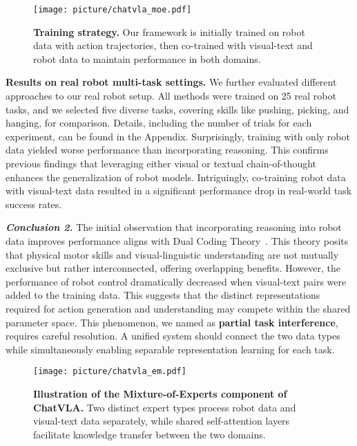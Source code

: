 \begin{figure}[t]
    \centering
    \texttt{[image: picture/chatvla\_moe.pdf]}
    \caption{\textbf{Training strategy.} Our framework is initially trained on robot data with action trajectories, then co-trained with visual-text and robot data to maintain performance in both domains.}
    \label{fig:stage}
\end{figure}
\textbf{Results on real robot multi-task settings.} We further evaluated different approaches to our real robot setup. All methods were trained on 25 real robot tasks, and we selected five diverse tasks, covering skills like pushing, picking, and hanging, for comparison.  Details, including the number of trials for each experiment, can be found in the Appendix.  Surprisingly, training with only robot data yielded worse performance than incorporating reasoning. This confirms previous findings that leveraging either visual or textual chain-of-thought enhances the generalization of robot models.  Intriguingly, co-training robot data with visual-text data resulted in a significant performance drop in real-world task success rates.

\textbf{\textit{Conclusion 2.}} The initial observation that incorporating reasoning into robot data improves performance aligns with Dual Coding Theory~\cite{paivio1991dual}.  This theory posits that physical motor skills and visual-linguistic understanding are not mutually exclusive but rather interconnected, offering overlapping benefits. However, the performance of robot control dramatically decreased when visual-text pairs were added to the training data. This suggests that the distinct representations required for action generation and understanding may compete within the shared parameter space. This phenomenon, we named as \textbf{partial task interference}, requires careful resolution. A unified system should connect the two data types while simultaneously enabling separable representation learning for each task.


\begin{figure}[t]
    \centering
    \texttt{[image: picture/chatvla\_em.pdf]}
    \caption{\textbf{Illustration of the Mixture-of-Experts component of ChatVLA.} Two distinct expert types process robot data and visual-text data separately, while shared self-attention layers facilitate knowledge transfer between the two domains.}
    \label{fig:framework}
    \vspace{-1mm}
\end{figure}

